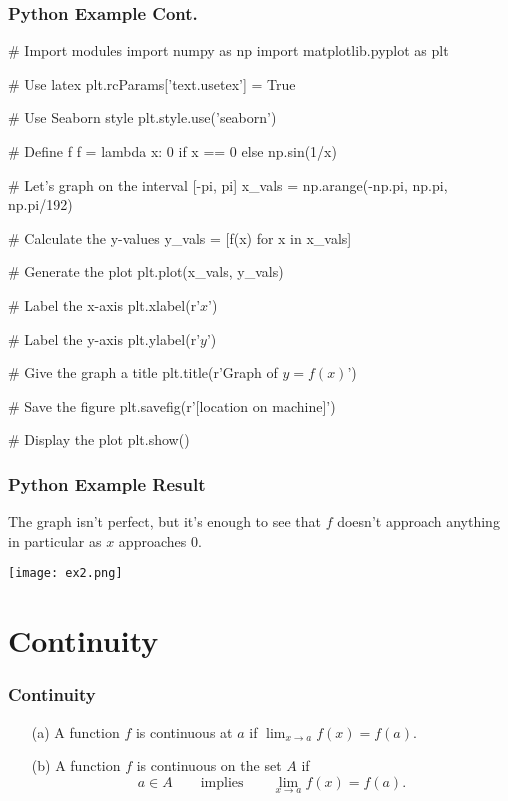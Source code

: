 \documentclass{beamer}
\begin{document}
\begin{frame}[fragile]
\frametitle{Python Example Cont.}
{
\linespread{0.8}
\tiny
\begin{verbatim*}
# Import modules 
import numpy as np
import matplotlib.pyplot as plt

# Use latex
plt.rcParams['text.usetex'] = True

# Use Seaborn style
plt.style.use('seaborn')

# Define f
f = lambda x: 0 if x == 0 else np.sin(1/x)   
        
# Let's graph on the interval [-pi, pi]
x_vals = np.arange(-np.pi, np.pi, np.pi/192)

# Calculate the y-values
y_vals = [f(x) for x in x_vals]

# Generate the plot
plt.plot(x_vals, y_vals)

# Label the x-axis
plt.xlabel(r'$x$')

# Label the y-axis
plt.ylabel(r'$y$')

# Give the graph a title
plt.title(r'Graph of $y = f(x)$')

# Save the figure
plt.savefig(r'[location on machine]')

# Display the plot
plt.show()
\end{verbatim*}
}
\end{frame}

\begin{frame}
\frametitle{Python Example Result}
The graph isn't perfect, but it's enough to see that $f$ doesn't approach anything in particular as $x$ approaches 0.
\begin{center}
\texttt{[image: ex2.png]}
\end{center}
\end{frame}


\section{Continuity} 


\begin{frame}
\frametitle{Continuity}
\begin{Definition}
\begin{enumerate}
\item[(a)] A function $f$ is continuous at $a$ if $\displaystyle \lim_{x\to a} f(x) = f(a)$.
\item[(b)] A function $f$ is continuous on the set $A$ if
$$
a\in A\qquad\text{implies}\qquad \lim_{x\to a} f(x) = f(a).
$$
\end{enumerate}
\end{Definition}
\end{frame}
\end{document}

